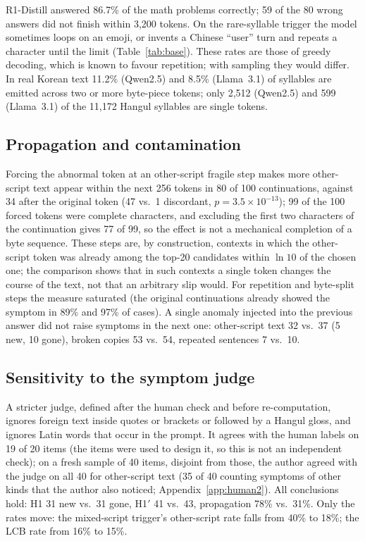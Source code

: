 \documentclass[11pt]{article}
\begin{document}
R1-Distill answered 86.7\% of the math problems correctly; 59 of the 80 wrong answers did not finish within 3,200 tokens.
On the rare-syllable trigger the model sometimes loops on an emoji, or invents a Chinese ``user'' turn and repeats a
character until the limit (Table~\ref{tab:base}). These rates are those of greedy decoding, which is known to favour
repetition; with sampling they would differ. In real Korean text 11.2\% (Qwen2.5) and 8.5\% (Llama~3.1) of syllables are
emitted across two or more byte-piece tokens; only 2,512 (Qwen2.5) and 599 (Llama~3.1) of the 11,172 Hangul syllables are
single tokens.

\subsection{Propagation and contamination}\label{sec:propagation}

Forcing the abnormal token at an other-script fragile step makes more other-script text appear within the next 256 tokens in
80 of 100 continuations, against 34 after the original token (47 vs.\ 1 discordant, $p=3.5\times10^{-13}$); 99 of the 100
forced tokens were complete characters, and excluding the first two characters of the continuation gives 77 of 99, so the
effect is not a mechanical completion of a byte sequence. These steps are, by construction, contexts in which the
other-script token was already among the top-20 candidates within $\ln 10$ of the chosen one; the comparison shows that in
such contexts a single token changes the course of the text, not that an arbitrary slip would. For repetition and
byte-split steps the measure saturated (the original continuations already showed the symptom in 89\% and 97\% of cases). A
single anomaly injected into the previous answer did not raise symptoms in the next one: other-script text 32 vs.\ 37 (5 new,
10 gone), broken copies 53 vs.\ 54, repeated sentences 7 vs.\ 10.

\subsection{Sensitivity to the symptom judge}\label{sec:sensitivity}

A stricter judge, defined after the human check and before re-computation, ignores foreign text inside quotes or brackets or
followed by a Hangul gloss, and ignores Latin words that occur in the prompt. It agrees with the human labels on 19 of 20
items (the items were used to design it, so this is not an independent check); on a fresh sample of 40 items, disjoint from
those, the author agreed with the judge on all 40 for other-script text (35 of 40 counting symptoms of other kinds that the
author also noticed; Appendix~\ref{app:human2}). All conclusions hold: H1 31 new vs.\ 31 gone, H1$'$ 41 vs.\ 43,
propagation 78\% vs.\ 31\%. Only the rates move: the mixed-script trigger's other-script rate falls from 40\% to 18\%; the
LCB rate from 16\% to 15\%.
\end{document}
